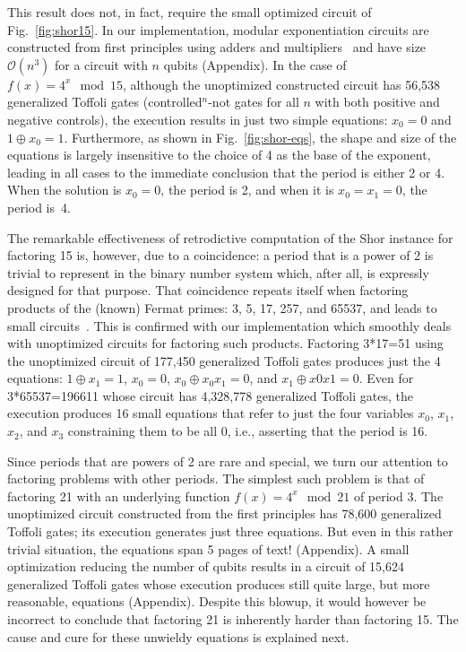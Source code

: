\documentclass[aps,prl,twocolumn,superscriptaddress,floatfix,notitlepage]{revtex4-2}
\begin{document}
This result does not, in fact, require the small optimized circuit of
Fig.~\ref{fig:shor15}. In our implementation, modular exponentiation
circuits are constructed from first principles using adders and
multipliers~\cite{PhysRevA.54.147} and have size $\mathcal{O}(n^3)$ for a circuit with $n$ qubits (Appendix). In the case of $f(x) = 4^x
\mod{15}$, although the unoptimized constructed circuit has 56,538
generalized Toffoli gates (controlled$^{n}$-not gates for all $n$ with both positive and negative controls),
the execution results in just two simple equations: $x_0 = 0$ and $1
\oplus x_0 = 1$. Furthermore, as shown in Fig.~\ref{fig:shor-eqs}, the
shape and size of the equations is largely insensitive to the choice
of 4 as the base of the exponent, leading in all cases to the
immediate conclusion that the period is either 2 or 4. When the
solution is $x_0=0$, the period is 2, and when it is $x_0=x_1=0$, the
period is~4.

The remarkable effectiveness of retrodictive computation of the Shor
instance for factoring 15 is, however, due to a coincidence: a period that is a
power of 2 is trivial to represent in the binary number system
which, after all, is expressly designed for that purpose. That
coincidence repeats itself when factoring products of the (known)
Fermat primes: 3, 5, 17, 257, and 65537, and leads to small
circuits~\cite{shorFermat}. This is confirmed with our implementation
which smoothly deals with unoptimized circuits for factoring such
products. Factoring 3*17=51 using the unoptimized circuit of 177,450
generalized Toffoli gates produces just the 4 equations: $1 \oplus x_1
= 1$, $x_0 = 0$, $x_0 \oplus x_0x_1 = 0$, and $x_1 \oplus x0x1 =
0$. Even for 3*65537=196611 whose circuit has 4,328,778 generalized
Toffoli gates, the execution produces 16 small equations that refer to
just the four variables $x_0$, $x_1$, $x_2$, and $x_3$ constraining
them to be all 0, i.e., asserting that the period is 16.

Since periods that are powers of 2 are rare and special, we turn our
attention to factoring problems with other periods. The simplest such
problem is that of factoring 21 with an underlying function $f(x) =
4^x \mod{21}$ of period 3. The unoptimized circuit constructed from
the first principles has 78,600 generalized Toffoli gates; its
execution generates just three equations. But even in this rather
trivial situation, the equations span 5 pages of text!  (Appendix). A small optimization reducing the number of qubits results
in a circuit of 15,624 generalized Toffoli gates whose execution
produces still quite large, but more reasonable, equations
(Appendix). Despite this blowup, it would however be incorrect to conclude that factoring 21 is
inherently harder than factoring 15. The cause and cure for these unwieldy equations is explained next. 
\end{document}
